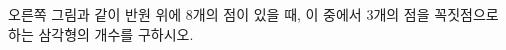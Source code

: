 \noindent\begin{minipage}[t]{0.58\linewidth}\vspace{0pt}\raggedright 오른쪽 그림과 같이 반원 위에 8개의 점이 있을 때, 이 중에서 3개의 점을 꼭짓점으로 하는 삼각형의 개수를 구하시오.\end{minipage}\hfill\begin{minipage}[t]{0.4\linewidth}\vspace{0pt}\centering \resizebox{\ifdim\width>\linewidth\linewidth\else\width\fi}{!}{}\end{minipage}\par

